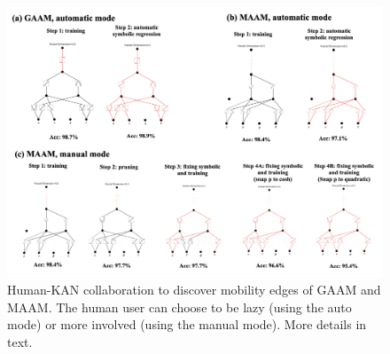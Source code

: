 \documentclass{article}
\numberwithin{equation}{section}
\numberwithin{figure}{section}
\begin{document}
\begin{figure}[t]
    \centering
    \includegraphics[width=1\linewidth]{./figs/al_complex.png}
    \caption{Human-KAN collaboration to discover mobility edges of GAAM and MAAM. The human user can choose to be lazy (using the auto mode) or more involved (using the manual mode). More details in text.}
    \label{fig:al_complex}
\end{figure}

\end{document}
